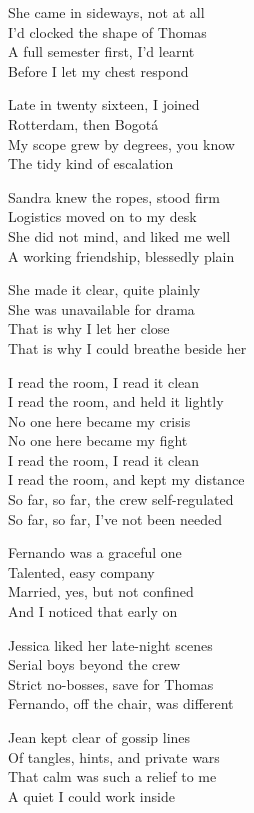 \begin{lyrics}
She came in sideways, not at all\\
I’d clocked the shape of Thomas\\
A full semester first, I’d learnt\\
Before I let my chest respond

Late in twenty sixteen, I joined\\
Rotterdam, then Bogotá\\
My scope grew by degrees, you know\\
The tidy kind of escalation

Sandra knew the ropes, stood firm\\
Logistics moved on to my desk\\
She did not mind, and liked me well\\
A working friendship, blessedly plain

She made it clear, quite plainly\\
She was unavailable for drama\\
That is why I let her close\\
That is why I could breathe beside her

I read the room, I read it clean\\
I read the room, and held it lightly\\
No one here became my crisis\\
No one here became my fight\\
I read the room, I read it clean\\
I read the room, and kept my distance\\
So far, so far, the crew self-regulated\\
So far, so far, I’ve not been needed

Fernando was a graceful one\\
Talented, easy company\\
Married, yes, but not confined\\
And I noticed that early on

Jessica liked her late-night scenes\\
Serial boys beyond the crew\\
Strict no-bosses, save for Thomas\\
Fernando, off the chair, was different

Jean kept clear of gossip lines\\
Of tangles, hints, and private wars\\
That calm was such a relief to me\\
A quiet I could work inside


\end{lyrics}
